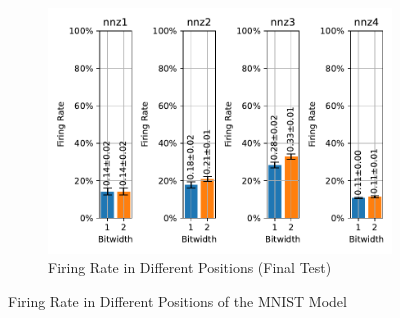         \begin{figure}[H]
            \centering
            \ContinuedFloat
            \begin{subfigure}[H]{\textwidth}
                \centering
                \includegraphics[width=\textwidth]{../firerate/MNIST/plots/mnist_final_firerate.pdf}
                \caption{Firing Rate in Different Positions (Final Test)}
            \end{subfigure}
            \caption{Firing Rate in Different Positions of the MNIST Model}
        \end{figure}

